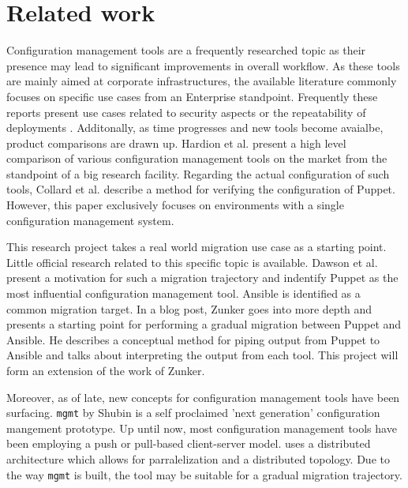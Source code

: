 \chapter{Related work}\label{ch:relatedwork}
Configuration management tools are a frequently researched topic as their presence may lead to significant improvements in overall workflow. As these tools are mainly aimed at corporate infrastructures, the available literature commonly focuses on specific use cases from an Enterprise standpoint. Frequently these reports present use cases related to security aspects \cite{dotson2014security} or the repeatability of deployments \cite{ruiz2015reconstructable}. Additonally, as time progresses and new tools become avaialbe, product comparisons are drawn up. Hardion et al. \cite{Hardion2013} present a high level comparison of various configuration management tools on the market from the standpoint of a big research facility. Regarding the actual configuration of such tools, Collard et al. \cite{Collard2015} describe a method for verifying the configuration of Puppet. However, this paper exclusively focuses on environments with a single configuration management system. 

This research project takes a real world migration use case as a starting point. Little official research related to this specific topic is available. Dawson et al. \cite{dawson_hall_hecht_2014} present a motivation for such a migration trajectory and indentify Puppet as the most influential configuration management tool. Ansible is identified as a common migration target. In a blog post, Zunker \cite{zunker_2014} goes into more depth and presents a starting point for performing a gradual migration between Puppet and Ansible. He describes a conceptual method for piping output from Puppet to Ansible and talks about interpreting the output from each tool. This project will form an extension of the work of Zunker.   

Moreover, as of late, new concepts for configuration management tools have been surfacing. \texttt{mgmt} by Shubin \cite{shubin2016} is a self proclaimed 'next generation' configuration mangement prototype.  Up until now, most configuration management tools have been employing a push or pull-based client-server model.  uses a distributed architecture which allows for parralelization and a distributed topology. Due to the way \texttt{mgmt} is built, the tool may be suitable for a gradual migration trajectory. 

